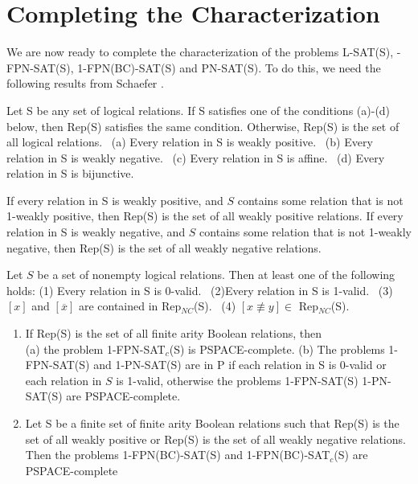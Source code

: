 \section{Completing the Characterization}\label{sec:char}

We are now ready to complete the characterization of the problems 
{\sf L-SAT(S)},
{-FPN-SAT(S), 1-FPN(BC)-SAT(S)} and {\sf PN-SAT(S)}. 
To do this, we need the  following results from Schaefer \cite{Sc78}.


\begin{theorem}\label{th:sch3.0}
Let S 
be any set of logical relations. If S satisfies one of the conditions
(a)-(d) below, then Rep(S) satisfies the same condition. Otherwise,
Rep(S) is the set of all logical relations.~
(a) Every relation in  S is weakly positive.~
(b) Every relation in S is weakly negative.~
(c) Every relation in S is affine.~
(d) Every relation in S  is bijunctive.
\end{theorem}


\begin{theorem}\label{th:sch5.1}
If every relation in S is weakly positive, and $S$ contains some relation
that is not 1-weakly positive, then Rep(S) is the set of all weakly positive
relations.
If every relation in S is weakly negative, and $S$ contains some relation
that is not 1-weakly negative, then Rep(S) is the set of all weakly negative
relations.
\end{theorem}

\begin{lemma}\label{le:sch4.3}
Let $S$ be a set of nonempty logical relations. Then at least one of the 
following holds:
\oldspacing
(1) Every relation in S is 0-valid.~
(2)Every relation in S is 1-valid.~
(3) $[x]$ and $[\overline{x}]$ are contained in Rep$_{NC}$(S).~
(4) $[x \not\equiv y] \in$ Rep$_{NC}$(S).
\end{lemma}


\begin{theorem}\label{th:hsatshard}
\begin{enumerate}
\item
If Rep(S) is the set of all finite arity Boolean relations, then\\
(a) the problem 1-FPN-SAT$_c$(S) is PSPACE-complete.
(b) The problems 1-FPN-SAT(S) and 1-PN-SAT(S) are  in P if each relation
in S is 0-valid or each relation in $S$ is 1-valid, otherwise
the problems 1-FPN-SAT(S) 1-PN-SAT(S) are  PSPACE-complete.
\item
Let S be a finite set of finite arity Boolean relations such that
Rep(S) is the set of all weakly positive or Rep(S) is the set
of all weakly negative relations. Then
the problems 1-FPN(BC)-SAT(S) and 1-FPN(BC)-SAT$_c$(S) are PSPACE-complete
\end{enumerate}
\end{theorem}

